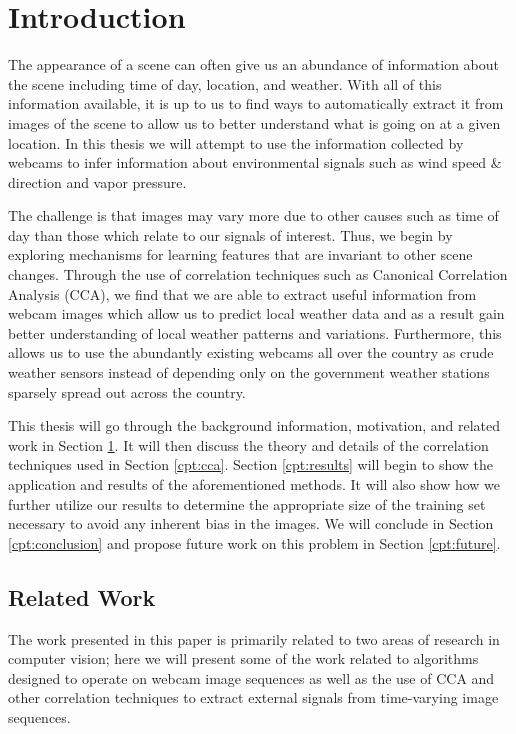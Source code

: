 \chapter{Introduction}
\label{cpt:intro}
The appearance of a scene can often give us an abundance of information about the scene including time of day, location, and weather. With all of this information available, it is up to us to find ways to automatically extract it from images of the scene to allow us to better understand what is going on at a given location. In this thesis we will attempt to use the information collected by webcams to infer information about environmental signals such as wind speed \& direction and vapor pressure. 

The challenge is that images may vary more due to other causes such as time of day than those which relate to our signals of interest. Thus, we begin by exploring mechanisms for learning features that are invariant to other scene changes. Through the use of correlation techniques such as Canonical Correlation Analysis (CCA), we find that we are able to extract useful information from webcam images which allow us to predict local weather data and as a result gain better understanding of local weather patterns and variations. Furthermore, this allows us to use the abundantly existing webcams all over the country as crude weather sensors instead of depending only on the government weather stations sparsely spread out across the country. 

This thesis will go through the background information, motivation, and related work in Section \ref{cpt:intro}. It will then discuss the theory and details of the correlation techniques used in Section \ref{cpt:cca}. Section \ref{cpt:results} will begin to show the application and results of the aforementioned methods. It will also show how we further utilize our results to determine the appropriate size of the training set necessary to avoid any inherent bias in the images. We will conclude in Section \ref{cpt:conclusion} and propose future work on this problem in Section \ref{cpt:future}.

\section{Related Work}
The work presented in this paper is primarily related to two areas of research in computer vision; here we will present some of the work related to algorithms designed to operate on webcam image sequences as well as the use of CCA and other correlation techniques to extract external signals from time-varying image sequences.

